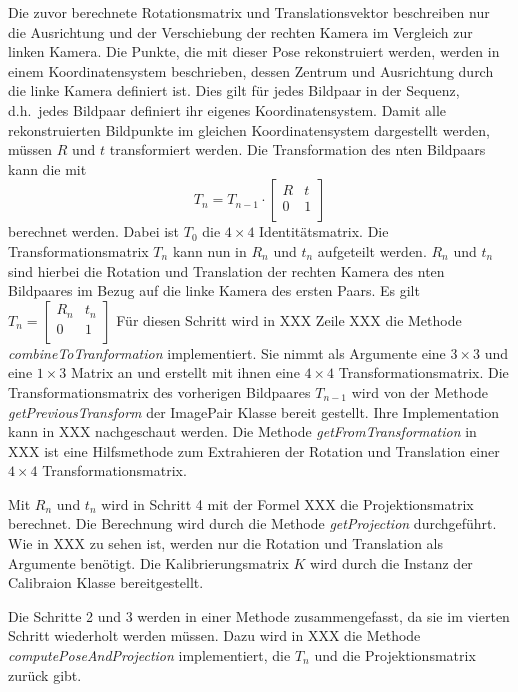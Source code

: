 Die zuvor berechnete Rotationsmatrix und Translationsvektor beschreiben nur die Ausrichtung und der Verschiebung der rechten Kamera im Vergleich zur linken Kamera.
Die Punkte, die mit dieser Pose rekonstruiert werden, werden in einem Koordinatensystem beschrieben, dessen Zentrum und Ausrichtung durch die linke Kamera definiert ist.
Dies gilt für jedes Bildpaar in der Sequenz, d.h.\ jedes Bildpaar definiert ihr eigenes Koordinatensystem.
Damit alle rekonstruierten Bildpunkte im gleichen Koordinatensystem dargestellt werden, müssen $R$ und $t$ transformiert werden.
Die Transformation des nten Bildpaars kann die mit 
\[ T_n = T_{n-1} \cdot \begin{bmatrix}
            R & t \\
            0 & 1 \\
        \end{bmatrix}
    \] 
berechnet werden.
Dabei ist $T_0$ die $4 \times 4$ Identitätsmatrix.
Die Transformationsmatrix $T_n$ kann nun in $R_n$ und $t_n$ aufgeteilt werden. 
$R_n$ und $t_n$ sind hierbei die Rotation und Translation der rechten Kamera des nten Bildpaares im Bezug auf die linke Kamera des ersten Paars.
Es gilt $T_n = \begin{bmatrix}
                R_n & t_n \\
                0 & 1 \\
            \end{bmatrix}$
Für diesen Schritt wird in XXX Zeile XXX die Methode \emph{combineToTranformation} implementiert.
Sie nimmt als Argumente eine $3 \times 3$ und eine $1\times3$ Matrix an und erstellt mit ihnen eine 
$4\times4$ Transformationsmatrix.
Die Transformationsmatrix des vorherigen Bildpaares $T_{n-1}$ wird von der Methode \emph{getPreviousTransform} der ImagePair Klasse bereit gestellt.
Ihre Implementation kann in XXX nachgeschaut werden.
Die Methode \emph{getFromTransformation} in XXX ist eine Hilfsmethode zum Extrahieren der Rotation und Translation einer $4\times4$ Transformationsmatrix.

Mit $R_n$ und $t_n$ wird in Schritt 4 mit der Formel XXX die Projektionsmatrix berechnet.
Die Berechnung wird durch die Methode \emph{getProjection} durchgeführt.
Wie in XXX zu sehen ist, werden nur die Rotation und Translation als Argumente benötigt.
Die Kalibrierungsmatrix $K$ wird durch die Instanz der Calibraion Klasse bereitgestellt. 

Die Schritte 2 und 3 werden in einer Methode zusammengefasst, da sie im vierten Schritt wiederholt werden müssen.
Dazu wird in XXX die Methode \emph{computePoseAndProjection} implementiert, die $T_n$ und die Projektionsmatrix zurück gibt.

